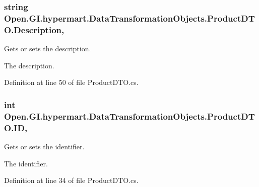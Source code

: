 \subsubsection[{Description}]{\setlength{\rightskip}{0pt plus 5cm}string Open.\+G\+I.\+hypermart.\+Data\+Transformation\+Objects.\+Product\+D\+T\+O.\+Description\hspace{0.3cm}{\ttfamily [get]}, {\ttfamily [set]}}\label{class_open_1_1_g_i_1_1hypermart_1_1_data_transformation_objects_1_1_product_d_t_o_a1de153f9a50688af8c97932d30056fef}


Gets or sets the description. 

The description. 

Definition at line 50 of file Product\+D\+T\+O.\+cs.

\hypertarget{class_open_1_1_g_i_1_1hypermart_1_1_data_transformation_objects_1_1_product_d_t_o_ab965f0f2be3b04afb1de5e8fa97cd93a}{}
\subsubsection[{I\+D}]{\setlength{\rightskip}{0pt plus 5cm}int Open.\+G\+I.\+hypermart.\+Data\+Transformation\+Objects.\+Product\+D\+T\+O.\+I\+D\hspace{0.3cm}{\ttfamily [get]}, {\ttfamily [set]}}\label{class_open_1_1_g_i_1_1hypermart_1_1_data_transformation_objects_1_1_product_d_t_o_ab965f0f2be3b04afb1de5e8fa97cd93a}


Gets or sets the identifier. 

The identifier. 

Definition at line 34 of file Product\+D\+T\+O.\+cs.

\hypertarget{class_open_1_1_g_i_1_1hypermart_1_1_data_transformation_objects_1_1_product_d_t_o_a900af3a5017cf99ef7a51c8a496289cc}{}
